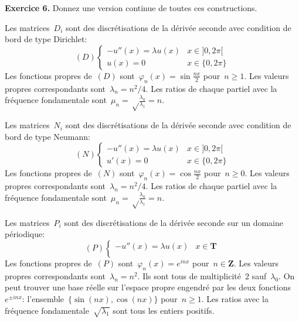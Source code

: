 {\color{blue}
{\bf Exercice 6.}
Donnez une version continue de toutes ces constructions.
}

Les matrices~$D_i$ sont des discrétisations de la dérivée seconde avec condition
de bord de type Dirichlet:
\[
	(D)
	\begin{cases}
		-u''(x) = \lambda u(x) & x\in]0,2\pi[ \\
		u(x) = 0 & x\in\{0,2\pi\}
	\end{cases}
\]
Les fonctions propres de~$(D)$ sont~$\varphi_n(x)=\sin\frac{nx}2$ pour~$n\ge
1$.  Les valeurs propres correspondants sont~$\lambda_n=n^2/4$.
Les ratios de
chaque partiel avec la fréquence fondamentale
sont~$\mu_n=\sqrt\frac{\lambda_n}{\lambda_1}=n$.

Les matrices~$N_i$ sont des discrétisations de la dérivée seconde avec
condition de bord de type Neumann:
\[
	(N)
	\begin{cases}
		-u''(x) = \lambda u(x) & x\in]0,2\pi[ \\
		u'(x) = 0 & x\in\{0,2\pi\}
	\end{cases}
\]
Les fonctions propres de~$(N)$ sont~$\varphi_n(x)=\cos\frac{nx}2$ pour~$n\ge
0$.  Les valeurs propres correspondants sont~$\lambda_n=n^2/4$.
Les ratios de
chaque partiel avec la fréquence fondamentale
sont~$\mu_n=\sqrt\frac{\lambda_n}{\lambda_1}=n$.

Les matrices~$P_i$ sont des discrétisations de la dérivée seconde sur un
domaine périodique:
\[
	(P)
	\begin{cases}
		-u''(x) = \lambda u(x) & x\in\mathbf{T} \\
	\end{cases}
\]
Les fonctions propres de~$(P)$ sont~$\varphi_n(x)=e^{inx}$
pour~$n\in\mathbf{Z}$.  Les valeurs propres correspondants
sont~$\lambda_n=n^2$.  Ils sont tous de multiplicité~$2$ sauf~$\lambda_0$.  On
peut trouver une base réelle sur l'espace propre engendré par les deux
fonctions~$e^{\pm inx}$: l'ensemble~$\{\sin(nx), \cos(nx)\}$ pour~$n\ge 1$.
Les ratios avec la fréquence fondamentale~$\sqrt{\lambda_1}$ sont tous les
entiers positifs.



